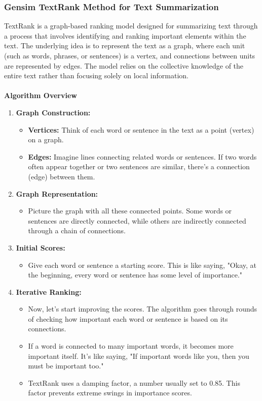 \documentclass{ieeeaccess}
\begin{document}
\subsubsection{Gensim TextRank Method for Text Summarization}
TextRank is a graph-based ranking model designed for summarizing text through a process that involves identifying and ranking important elements within the text. The underlying idea is to represent the text as a graph, where each unit (such as words, phrases, or sentences) is a vertex, and connections between units are represented by edges. The model relies on the collective knowledge of the entire text rather than focusing solely on local information.\cite{textrank}\\\\
\textbf{Algorithm Overview}
\begin{enumerate}
    \item \textbf{Graph Construction:}
    \begin{itemize}
        \item \textbf{Vertices:} Think of each word or sentence in the text as a point (vertex) on a graph.
        \item \textbf{Edges:} Imagine lines connecting related words or sentences. If two words often appear together or two sentences are similar, there's a connection (edge) between them.
    \end{itemize}
    
    \item \textbf{Graph Representation:}
    \begin{itemize}
        \item Picture the graph with all these connected points. Some words or sentences are directly connected, while others are indirectly connected through a chain of connections.
    \end{itemize}
    
    \item \textbf{Initial Scores:}
    \begin{itemize}
        \item Give each word or sentence a starting score. This is like saying, "Okay, at the beginning, every word or sentence has some level of importance."
    \end{itemize}
    
    \item \textbf{Iterative Ranking:}
    \begin{itemize}
        \item Now, let's start improving the scores. The algorithm goes through rounds of checking how important each word or sentence is based on its connections.
        \item If a word is connected to many important words, it becomes more important itself. It's like saying, "If important words like you, then you must be important too."
        \item TextRank uses a damping factor, a number usually set to 0.85. This factor prevents extreme swings in importance scores.
    \end{itemize}
    

\end{enumerate}
\end{document}
